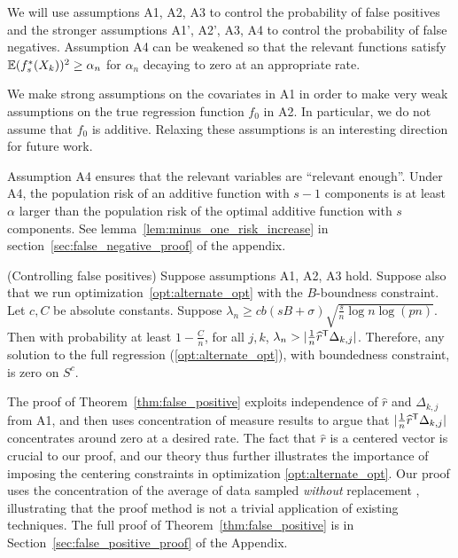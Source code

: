 We will use assumptions A1, A2, A3 to control the probability of false
positives and the stronger assumptions A1', A2', A3, A4 to control the
probability of false negatives.  Assumption A4 can be
weakened so that the relevant functions satisfy
${\mathbb E}(f^*_s(X_k))^2 \geq \alpha_n$ for $\alpha_n$ decaying to zero 
at an appropriate rate.



\begin{remark}
  We make strong assumptions on the covariates in A1 in order to make
  very weak assumptions on the true regression function $f_0$ in
  A2. In particular, we do not assume that $f_0$ is additive. Relaxing
  these assumptions is an interesting direction for future work. 
\end{remark}

\begin{remark}
Assumption A4 ensures that the relevant variables are ``relevant enough''. Under A4, the population risk of an additive function with $s-1$ components is at least $\alpha$ larger than the population risk of the optimal additive function with $s$ components. See lemma~\ref{lem:minus_one_risk_increase} in section~\ref{sec:false_negative_proof} of the appendix.
\end{remark}

\begin{theorem} (Controlling false positives) 
\label{thm:false_positive}
Suppose assumptions A1, A2, A3 hold. Suppose also that we run optimization~\eqref{opt:alternate_opt} with the $B$-boundness constraint. Let $c,C$ be absolute constants.
Suppose $\lambda_n \geq c b (sB + \sigma) \sqrt{ \frac{s}{n} \log n
  \log (pn)}$.  Then with probability at least $ 1 - \frac{C}{n}$, for all $j,k$, $\lambda_n >  | \frac{1}{n} \widehat{r}^{\mathsf{T}} \Delta_{k,j}|$.
Therefore, any solution to the full regression (\ref{opt:alternate_opt}), with boundedness constraint, is zero on $S^c$. 
\end{theorem}

The proof of Theorem~\ref{thm:false_positive} exploits independence of
$\hat{r}$ and $\Delta_{k,j}$ from A1, and then uses concentration of
measure results to argue that $| \frac{1}{n} \widehat{r}^{\mathsf{T}}
\Delta_{k,j}|$ concentrates around zero at a desired rate. The fact
that $\hat{r}$ is a centered vector is crucial to our proof, and our
theory thus further illustrates the importance of imposing the
centering constraints in optimization \eqref{opt:alternate_opt}. Our
proof uses the concentration of the average of
data sampled \emph{without} replacement
\cite{serfling1974probability}, illustrating that the proof method is not a
trivial application of existing techniques. The full proof of
Theorem~\ref{thm:false_positive} is in
Section~\ref{sec:false_positive_proof} of the Appendix.

